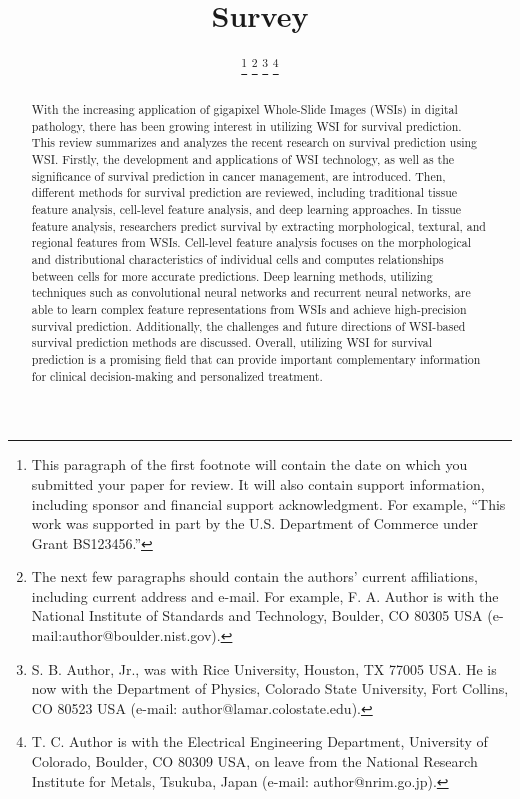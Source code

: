 \documentclass[journal,twoside,web]{ieeecolor}
\begin{document}
\title{Survey}
\author{
\thanks{This paragraph of the first footnote will contain the date on which
you submitted your paper for review. It will also contain support information,
including sponsor and financial support acknowledgment. For example, 
``This work was supported in part by the U.S. Department of Commerce under Grant BS123456.'' }
\thanks{The next few paragraphs should contain the authors' current affiliations,
including current address and e-mail. For example, F. A. Author is with the
National Institute of Standards and Technology, Boulder, CO 80305 USA (e-mail:author@boulder.nist.gov). }
\thanks{S. B. Author, Jr., was with Rice University, Houston, TX 77005 USA.
He is now with the Department of Physics, Colorado State University,
Fort Collins, CO 80523 USA (e-mail: author@lamar.colostate.edu).}
\thanks{T. C. Author is with the Electrical Engineering Department,
University of Colorado, Boulder, CO 80309 USA, on leave from the National
Research Institute for Metals, Tsukuba, Japan (e-mail: author@nrim.go.jp).}
}

\maketitle

\begin{abstract}
With the increasing application of gigapixel Whole-Slide Images (WSIs) in digital pathology, there has been growing interest in utilizing WSI for survival prediction. This review summarizes and analyzes the recent research on survival prediction using WSI. Firstly, the development and applications of WSI technology, as well as the significance of survival prediction in cancer management, are introduced. Then, different methods for survival prediction are reviewed, including traditional tissue feature analysis, cell-level feature analysis, and deep learning approaches. In tissue feature analysis, researchers predict survival by extracting morphological, textural, and regional features from WSIs. Cell-level feature analysis focuses on the morphological and distributional characteristics of individual cells and computes relationships between cells for more accurate predictions. Deep learning methods, utilizing techniques such as convolutional neural networks and recurrent neural networks, are able to learn complex feature representations from WSIs and achieve high-precision survival prediction. Additionally, the challenges and future directions of WSI-based survival prediction methods are discussed. Overall, utilizing WSI for survival prediction is a promising field that can provide important complementary information for clinical decision-making and personalized treatment.
\end{abstract}
\end{document}
